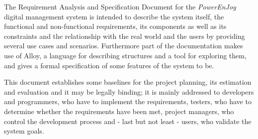 The Requirement Analysis and Specification Document for the \textit{PowerEnJoy} digital management system is intended to describe the system itself, the functional and non-functional requirements, its components as well as its constraints and the relationship with the real world and the users by providing several use cases and scenarios. Furthermore part of the documentation makes use of Alloy, a language for describing structures and a tool for exploring them, and gives a formal specification of some features of the system to be.

This document establishes some baselines for the project planning, its estimation and evaluation and it may be legally binding; it is mainly addressed to developers and programmers, who have to implement the requirements, testers, who have to determine whether the requirements have been met, project managers, who control the development process and - last but not least - users, who validate the system goals.